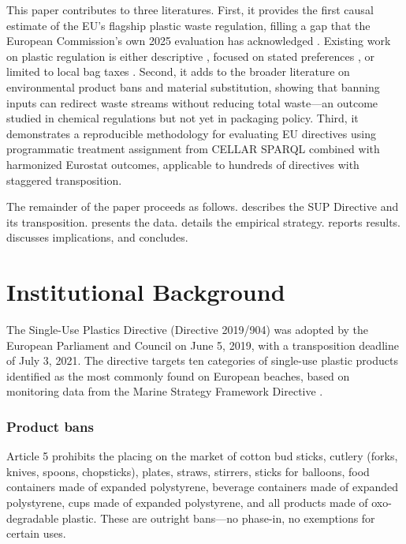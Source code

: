 \documentclass[12pt]{article}
\begin{document}
This paper contributes to three literatures. First, it provides the first causal estimate of the EU's flagship plastic waste regulation, filling a gap that the European Commission's own 2025 evaluation has acknowledged \citep{EC2025review}. Existing work on plastic regulation is either descriptive \citep{xanthos2017international, schnurr2018reducing}, focused on stated preferences \citep{convery2007most}, or limited to local bag taxes \citep{rivers2017using, taylor2019plastic}. Second, it adds to the broader literature on environmental product bans and material substitution, showing that banning inputs can redirect waste streams without reducing total waste---an outcome studied in chemical regulations \citep{greenstone2012impacts} but not yet in packaging policy. Third, it demonstrates a reproducible methodology for evaluating EU directives using programmatic treatment assignment from CELLAR SPARQL combined with harmonized Eurostat outcomes, applicable to hundreds of directives with staggered transposition.

The remainder of the paper proceeds as follows.  describes the SUP Directive and its transposition.  presents the data.  details the empirical strategy.  reports results.  discusses implications, and  concludes.


\section{Institutional Background}
\label{sec:background}

The Single-Use Plastics Directive (Directive 2019/904) was adopted by the European Parliament and Council on June 5, 2019, with a transposition deadline of July 3, 2021. The directive targets ten categories of single-use plastic products identified as the most commonly found on European beaches, based on monitoring data from the Marine Strategy Framework Directive \citep{EC2018impact}.

\subsubsection*{Product bans} Article 5 prohibits the placing on the market of cotton bud sticks, cutlery (forks, knives, spoons, chopsticks), plates, straws, stirrers, sticks for balloons, food containers made of expanded polystyrene, beverage containers made of expanded polystyrene, cups made of expanded polystyrene, and all products made of oxo-degradable plastic. These are outright bans---no phase-in, no exemptions for certain uses.
\end{document}

